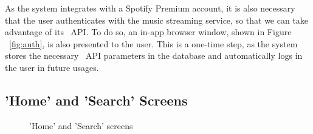 As the system integrates with a Spotify Premium account, it is also necessary that the user authenticates with the music streaming service, so that we can take advantage of its ~\ac{API}. To do so, an in-app browser window, shown in Figure ~\ref{fig:auth}, is also presented to the user. This is a one-time step, as the system stores the necessary ~\ac{API} parameters in the database and automatically logs in the user in future usages.

\newpage
\subsection{'Home' and 'Search' Screens}
\begin{figure}[htbp]
	\centering
	 \qquad
	 \qquad
	\caption{'Home' and 'Search' screens}
	\label{fig:mfp1}
\end{figure}


